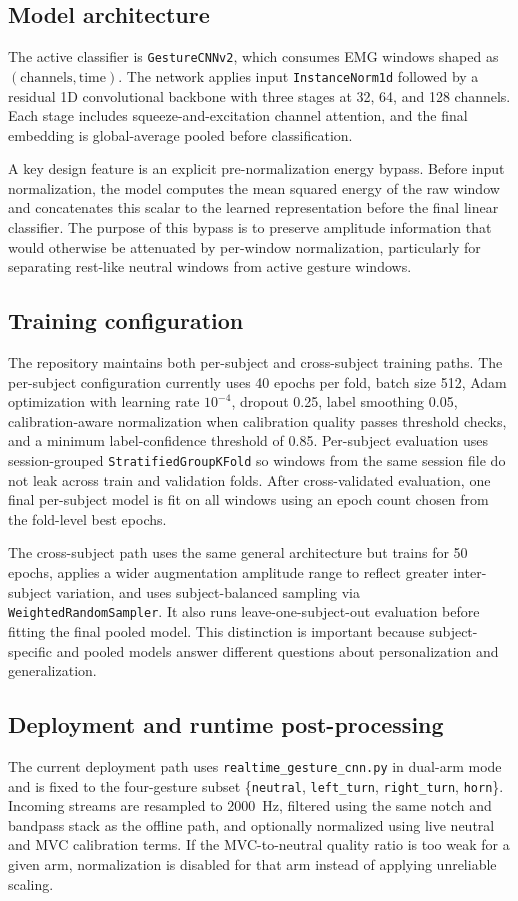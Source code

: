 \documentclass[11pt]{article}
\begin{document}
\subsection{Model architecture}
The active classifier is \texttt{GestureCNNv2}, which consumes EMG windows shaped as $(\mathrm{channels}, \mathrm{time})$. The network applies input \texttt{InstanceNorm1d} followed by a residual 1D convolutional backbone with three stages at 32, 64, and 128 channels. Each stage includes squeeze-and-excitation channel attention, and the final embedding is global-average pooled before classification.

A key design feature is an explicit pre-normalization energy bypass. Before input normalization, the model computes the mean squared energy of the raw window and concatenates this scalar to the learned representation before the final linear classifier. The purpose of this bypass is to preserve amplitude information that would otherwise be attenuated by per-window normalization, particularly for separating rest-like neutral windows from active gesture windows.

\subsection{Training configuration}
The repository maintains both per-subject and cross-subject training paths. The per-subject configuration currently uses 40 epochs per fold, batch size 512, Adam optimization with learning rate $10^{-4}$, dropout 0.25, label smoothing 0.05, calibration-aware normalization when calibration quality passes threshold checks, and a minimum label-confidence threshold of 0.85. Per-subject evaluation uses session-grouped \texttt{StratifiedGroupKFold} so windows from the same session file do not leak across train and validation folds. After cross-validated evaluation, one final per-subject model is fit on all windows using an epoch count chosen from the fold-level best epochs.

The cross-subject path uses the same general architecture but trains for 50 epochs, applies a wider augmentation amplitude range to reflect greater inter-subject variation, and uses subject-balanced sampling via \texttt{WeightedRandomSampler}. It also runs leave-one-subject-out evaluation before fitting the final pooled model. This distinction is important because subject-specific and pooled models answer different questions about personalization and generalization.

\subsection{Deployment and runtime post-processing}
The current deployment path uses \texttt{realtime\_gesture\_cnn.py} in dual-arm mode and is fixed to the four-gesture subset \{\texttt{neutral}, \texttt{left\_turn}, \texttt{right\_turn}, \texttt{horn}\}. Incoming streams are resampled to 2000~Hz, filtered using the same notch and bandpass stack as the offline path, and optionally normalized using live neutral and MVC calibration terms. If the MVC-to-neutral quality ratio is too weak for a given arm, normalization is disabled for that arm instead of applying unreliable scaling.
\end{document}
